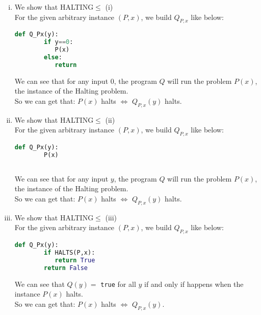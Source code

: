 \begin{enumerate}[(i)]
    \item We show that HALTING$\leq$ (i)\\
    For the given arbitrary instance $(P, x)$, we build $Q_{P,x}$ like below:
    \begin{lstlisting}[language=python]
    def Q_Px(y):
        if y==0:
           P(x)
        else:
           return
    \end{lstlisting}
    We can see that for any input 0, the program $Q$ will run the problem $P(x)$, the instance of the Halting problem.\\
    So we can get that: $P(x)$ halts $\Leftrightarrow$ $Q_{P,x}(y)$ halts.
    \item We show that HALTING$\leq$ (ii)\\
    For the given arbitrary instance $(P, x)$, we build $Q_{P,x}$ like below:
    \begin{lstlisting}[language=python]
    def Q_Px(y):
        P(x)
        
    \end{lstlisting}
    We can see that for any input $y$, the program $Q$ will run the problem $P(x)$, the instance of the Halting problem.\\
    So we can get that: $P(x)$ halts $\Leftrightarrow$ $Q_{P,x}(y)$ halts.
    \item We show that HALTING$\leq$ (iii)\\
    For the given arbitrary instance $(P, x)$, we build $Q_{P,x}$ like below:
    \begin{lstlisting}[language=python]
    def Q_Px(y):
        if HALTS(P,x):
           return True
        return False
    \end{lstlisting}
    We can see that $Q(y)=$ {\tt true} for all $y$ if and only if happens when the instance $P(x)$ halts.\\
    So we can get that: $P(x)$ halts $\Leftrightarrow$ $Q_{P,x}(y)$.
\end{enumerate}

